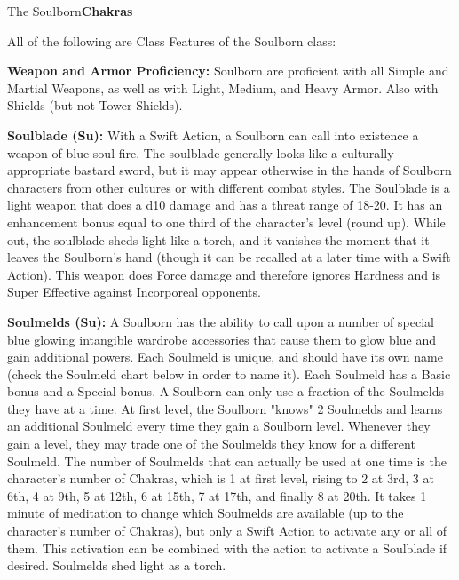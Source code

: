 \begin{extraclasstable}{The Soulborn}{\textbf{Chakras}}
\end{extraclasstable}

\ClassFeatures
All of the following are Class Features of the Soulborn class:

\textbf{Weapon and Armor Proficiency:} Soulborn are proficient with all Simple and Martial Weapons, as well as with Light, Medium, and Heavy Armor. Also with Shields (but not Tower Shields). 

\textbf{Soulblade (Su):} With a Swift Action, a Soulborn can call into existence a weapon of blue soul fire. The soulblade generally looks like a culturally appropriate bastard sword, but it may appear otherwise in the hands of Soulborn characters from other cultures or with different combat styles. The Soulblade is a light weapon that does a d10 damage and has a threat range of 18-20. It has an enhancement bonus equal to one third of the character's level (round up). While out, the soulblade sheds light like a torch, and it vanishes the moment that it leaves the Soulborn's hand (though it can be recalled at a later time with a Swift Action). This weapon does Force damage and therefore ignores Hardness and is Super Effective against Incorporeal opponents. 

\textbf{Soulmelds (Su):} A Soulborn has the ability to call upon a number of special blue glowing intangible wardrobe accessories that cause them to glow blue and gain additional powers. Each Soulmeld is unique, and should have its own name (check the Soulmeld chart below in order to name it). Each Soulmeld has a Basic bonus and a Special bonus. A Soulborn can only use a fraction of the Soulmelds they have at a time. At first level, the Soulborn "knows" 2 Soulmelds and learns an additional Soulmeld every time they gain a Soulborn level. Whenever they gain a level, they may trade one of the Soulmelds they know for a different Soulmeld. The number of Soulmelds that can actually be used at one time is the character's number of Chakras, which is 1 at first level, rising to 2 at 3rd, 3 at 6th, 4 at 9th, 5 at 12th, 6 at 15th, 7 at 17th, and finally 8 at 20th. It takes 1 minute of meditation to change which Soulmelds are available (up to the character's number of Chakras), but only a Swift Action to activate any or all of them. This activation can be combined with the action to activate a Soulblade if desired. Soulmelds shed light as a torch. 


